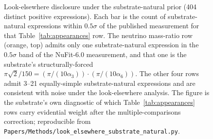 \documentclass[11pt,a4paper]{amsart}
\theoremstyle{plain}
\theoremstyle{definition}
\begin{document}
\begin{figure}[h]
\centering
{}
\caption{Look-elsewhere disclosure under the substrate-natural prior (404 distinct positive expressions). Each bar is the count of substrate-natural expressions within $0.5\sigma$ of the published measurement for that Table~\ref{tab:appearances} row. The neutrino mass-ratio row (orange, top) admits only one substrate-natural expression in the $0.5\sigma$ band of the NuFit-6.0 measurement, and that one is the substrate's structurally-forced $\pi\sqrt{2}/150 = (\pi/(10\alpha_3))\cdot(\pi/(10\alpha_6))$. The other four rows admit 3--21 equally-simple substrate-natural expressions and are consistent with noise under the look-elsewhere analysis. The figure is the substrate's own diagnostic of which Table~\ref{tab:appearances} rows carry evidential weight after the multiple-comparisons correction; reproducible from \texttt{Papers/Methods/look\_elsewhere\_substrate\_natural.py}.}
\label{fig:lookelsewhere}
\end{figure}
\end{document}
